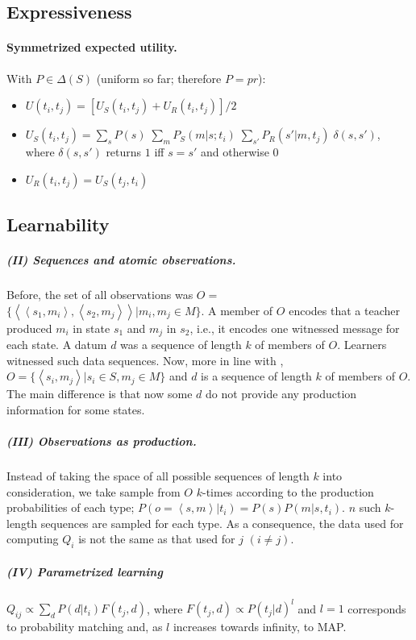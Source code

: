 \documentclass[a4paper]{article}
\newcommand{\tuple}[1]{\ensuremath{\left\langle #1 \right\rangle}}
\begin{document}
\subsection{Expressiveness}

\paragraph{Symmetrized expected utility.} With $P \in \Delta(S)$ (uniform so far; therefore $P = pr$):
\begin{itemize}

  \item $U(t_i,t_j) = [U_S(t_i,t_j) + U_R(t_i,t_j)] / 2$
  \item $U_S(t_i,t_j) = \sum_s P(s) \; \sum_m P_S(m|s;t_i) \; \sum_{s'} P_R(s'|m,t_j) \; \delta(s,s')$, where $\delta(s,s')$ returns $1$ iff $s = s'$ and otherwise $0$
  \item $U_R(t_i,t_j) = U_S(t_j,t_i)$
\end{itemize}


\subsection{Learnability}
\subparagraph{(II) Sequences and atomic observations.} Before, the set of all observations was $O =$\linebreak  $\{\tuple{\tuple{s_1,m_i},\tuple{s_2,m_j}} | m_i, m_j \in M\}$. A member of $O$ encodes that a teacher produced $m_i$ in state $s_1$ and $m_j$ in $s_2$, i.e., it encodes one witnessed message for each state. A datum $d$ was a sequence of length $k$ of members of $O$. Learners witnessed such data sequences. Now, more in line with \citet{griffiths+kalish:2007}, $O = \{\tuple{s_i,m_j} | s_i \in S, m_j \in M\}$ and $d$ is a sequence of length $k$ of members of $O$. The main difference is that now some $d$ do not provide any production information for some states.

\subparagraph{(III) Observations as production.} Instead of taking the space of all possible sequences of length $k$ into consideration, we take sample from $O$ $k$-times according to the production probabilities of each type; $P(o = \tuple{s,m} | t_i) = P(s) P(m|s,t_i)$. $n$ such $k$-length sequences are sampled for each type. As a consequence, the data used for computing $Q_i$ is not the same as that used for $j$ $(i \neq j)$.

\subparagraph{(IV) Parametrized learning} $Q_{ij} \propto \sum_d P(d|t_i) F(t_j,d)$, where $F(t_j,d) \propto P(t_j|d)^l$ and $l =1$ corresponds to probability matching and, as $l$ increases towards infinity, to MAP.  	      
\end{document}
